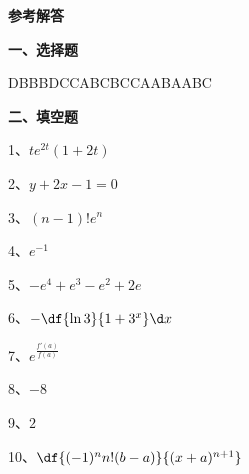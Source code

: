 \newpage

\begin{center}
	{\Large\bf 参考解答}
\end{center}

{\bf 一、选择题}

DBBBD\quad CCABC\quad BCCAA\quad BAABC

{\bf 二、填空题}

1、$te^{2t}(1+2t)$

2、$y+2x-1=0$

3、$(n-1)!e^{n}$

4、$e^{-1}$

5、$-e^4+e^3-e^2+2e$

6、$-\df{\ln3}{1+3^x}\d x$

7、$e^{\frac{f'(a)}{f(a)}}$

8、$-8$

9、$2$

10、$\df{(-1)^nn!(b-a)}{(x+a)^{n+1}}$